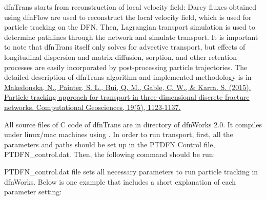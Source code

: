 \documentclass[letterpaper,10pt,english]{sphinxmanual}
\begin{document}
dfnTrans starts from  reconstruction of local velocity field: Darcy fluxes
obtained using dfnFlow are used to reconstruct the local velocity field, which
is used for particle tracking on the DFN. Then, Lagrangian transport simulation
is used to determine pathlines through the network and simulate transport. It is
important to note that dfnTrans itself only solves for advective transport, but
effects of longitudinal dispersion and matrix diffusion, sorption, and other
retention processes are easily incorporated by post-processing particle
trajectories. The detailed description of dfnTrans algorithm and implemented
methodology is in \href{http://link.springer.com/article/10.1007/s10596-015-9525-4}{Makedonska, N., Painter, S. L., Bui, Q. M., Gable, C. W., \&
Karra, S. (2015). Particle tracking approach for transport in three-dimensional
discrete fracture networks. Computational Geosciences, 19(5), 1123-1137.}

All source files of C code of dfnTrans are in  directory of
dfnWorks 2.0. It compiles under linux/mac machines using .  In order
to run transport, first, all the parameters and paths should be set up in the
PTDFN Control file, PTDFN\_control.dat. Then, the following command should be
run: 

PTDFN\_control.dat file sets all necessary parameters to run particle tracking in
dfnWorks.  Below is one  example that includes a short
explanation of each parameter setting:
\end{document}
